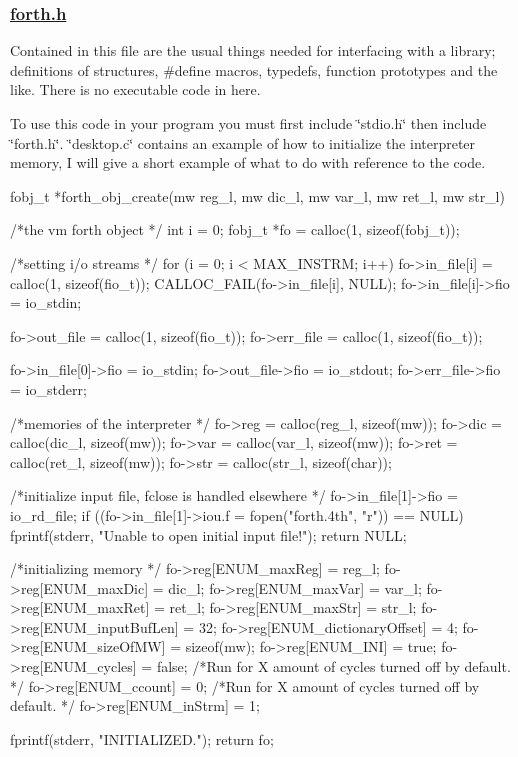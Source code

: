 \subsubsection*{\hyperlink{forth_8h_source}{forth.\-h}}

Contained in this file are the usual things needed for interfacing with a library; definitions of structures, \#define macros, typedefs, function prototypes and the like. There is no executable code in here.

To use this code in your program you must first include \char`\"{}stdio.\-h\char`\"{} then include \char`\"{}forth.\-h\char`\"{}. \char`\"{}desktop.\-c\char`\"{} contains an example of how to initialize the interpreter memory, I will give a short example of what to do with reference to the code. \begin{DoxyVerb}fobj_t *forth_obj_create(mw reg_l, mw dic_l, mw var_l, mw ret_l, mw str_l)
{
    /*the vm forth object */
    int i = 0;
    fobj_t *fo = calloc(1, sizeof(fobj_t));

    /*setting i/o streams */
    for (i = 0; i < MAX_INSTRM; i++) {
            fo->in_file[i] = calloc(1, sizeof(fio_t));
            CALLOC_FAIL(fo->in_file[i], NULL);
            fo->in_file[i]->fio = io_stdin;
    }

    fo->out_file = calloc(1, sizeof(fio_t));
    fo->err_file = calloc(1, sizeof(fio_t));

    fo->in_file[0]->fio = io_stdin;
    fo->out_file->fio = io_stdout;
    fo->err_file->fio = io_stderr;

    /*memories of the interpreter */
    fo->reg = calloc(reg_l, sizeof(mw));
    fo->dic = calloc(dic_l, sizeof(mw));
    fo->var = calloc(var_l, sizeof(mw));
    fo->ret = calloc(ret_l, sizeof(mw));
    fo->str = calloc(str_l, sizeof(char));

    /*initialize input file, fclose is handled elsewhere */
    fo->in_file[1]->fio = io_rd_file;
    if ((fo->in_file[1]->iou.f = fopen("forth.4th", "r")) == NULL) {
            fprintf(stderr, "Unable to open initial input file!\n");
            return NULL;
    }

    /*initializing memory */
    fo->reg[ENUM_maxReg] = reg_l;
    fo->reg[ENUM_maxDic] = dic_l;
    fo->reg[ENUM_maxVar] = var_l;
    fo->reg[ENUM_maxRet] = ret_l;
    fo->reg[ENUM_maxStr] = str_l;
    fo->reg[ENUM_inputBufLen] = 32;
    fo->reg[ENUM_dictionaryOffset] = 4;
    fo->reg[ENUM_sizeOfMW] = sizeof(mw);
    fo->reg[ENUM_INI] = true;
    fo->reg[ENUM_cycles] = false;   /*Run for X amount of cycles turned off by default. */
    fo->reg[ENUM_ccount] = 0;       /*Run for X amount of cycles turned off by default. */
    fo->reg[ENUM_inStrm] = 1;

    fprintf(stderr, "\tOBJECT INITIALIZED.\n");
    return fo;
}
\end{DoxyVerb}



